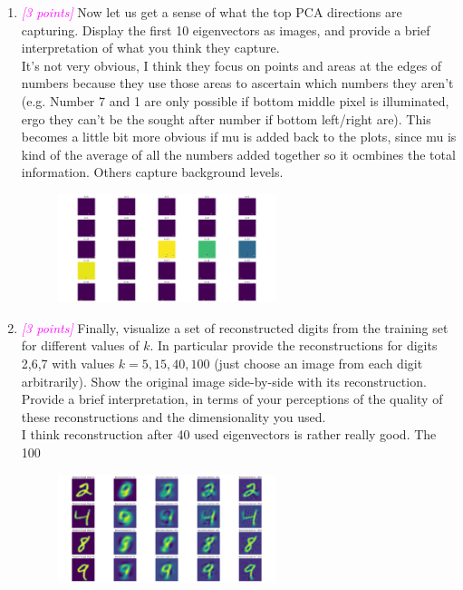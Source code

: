 \documentclass{article}
\newcommand{\1}{\mathbf{1}}
\newcommand{\points}[1]{\small\textcolor{magenta}{\emph{[#1 points]}} \normalsize}
\begin{document}
\begin{enumerate}
    \newpage
    \item \points{3} Now let us get a sense of what the top PCA directions are capturing. Display the first  10 eigenvectors as images, and provide a brief interpretation of what you think they capture. \\
    It's not very obvious, I think they focus on points and areas at the edges of numbers because they use those areas to ascertain which numbers they aren't (e.g. Number 7 and 1 are only possible if bottom middle pixel is illuminated, ergo they can't be the sought after number if bottom left/right are). This becomes a little bit more obvious if mu is added back to the plots, since mu is kind of the average of all the numbers added together so it ocmbines the total information. Others capture background levels.\\
    \begin{figure}[h!]
    \centering 
    \includegraphics[width=0.6\textwidth]{HW3/HW3_plots/A6b_Eigenvectors.png}
    \end{figure}
    
    \item \points{3} Finally, visualize a set of reconstructed digits from the training set for different values of $k$. In particular provide the reconstructions for digits 2,6,7 with values $k=5,15,40,100$ (just choose an image from each digit arbitrarily). Show the original image side-by-side with its reconstruction.  Provide a brief interpretation, in terms of your perceptions of the quality of these reconstructions and the dimensionality you used.\\
    I think reconstruction after 40 used eigenvectors is rather really good. The 100
    \begin{figure}[h!]
    \centering 
    \includegraphics[width=0.6\textwidth]{HW3/HW3_plots/A6c_Digits.png}
    \end{figure}
    
\end{enumerate}
\end{document}
